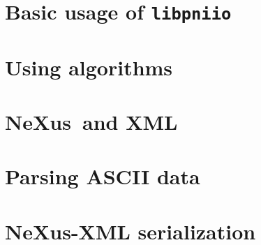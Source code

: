 \documentclass[a4paper,draft]{scrbook}
\newcommand{\libpniio}{\texttt{libpniio}}
\newcommand{\nexus}{NeXus}
\begin{document}
\chapter{Basic usage of \libpniio}

\FloatBarrier

\chapter{Using algorithms}
\FloatBarrier

\chapter{\nexus\ and XML}

\FloatBarrier

\appendix
\chapter{Parsing ASCII data}\label{appendix:parsers}

\FloatBarrier

\chapter{\nexus-XML serialization}



%
\end{document}
